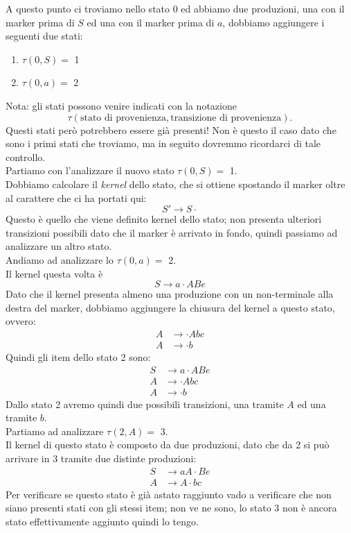 \documentclass[class=book, crop=false, oneside, 12pt]{standalone}
\begin{document}
A questo punto ci troviamo nello stato 0 ed abbiamo due produzioni, una con il marker prima di \(S\) ed una con il marker prima di \(a\), dobbiamo aggiungere i seguenti due stati:
\begin{enumerate}
    \item \(\tau (0, S) =\) 1
    \item \(\tau (0, a) =\) 2
\end{enumerate}
Nota: gli stati possono venire indicati con la notazione 
\begin{equation*}
    \tau( \textrm{stato di provenienza}, \textrm{transizione di provenienza}).
\end{equation*}
Questi stati però potrebbero essere già presenti! Non è questo il caso dato che sono i primi stati che troviamo, ma in seguito dovremmo ricordarci di tale controllo.
\\
Partiamo con l'analizzare il nuovo stato \(\tau (0, S) =\) 1. \\
Dobbiamo calcolare il \emph{kernel} dello stato, che si ottiene spostando il marker oltre al carattere che ci ha portati qui:
\begin{equation*}
    S' \to S \cdot
\end{equation*}
Questo è quello che viene definito kernel dello stato; non presenta ulteriori transizioni possibili dato che il marker è arrivato in fondo, quindi passiamo ad analizzare un altro stato.
\\
Andiamo ad analizzare lo \(\tau (0, a) =\) 2. \\
Il kernel questa volta è
\begin{equation*}
    S \to a \cdot ABe
\end{equation*}
Dato che il kernel presenta almeno una produzione con un non-terminale alla destra del marker, dobbiamo aggiungere la chiusura del kernel a questo stato, ovvero:
\begin{align*}
    A &\to \cdot Abc\\
	A &\to \cdot b
\end{align*}
Quindi gli item dello stato 2 sono:
\begin{align*}
    S &\to a \cdot ABe\\
    A &\to \cdot Abc\\
	A &\to \cdot b
\end{align*}
Dallo stato 2 avremo quindi due possibili transizioni, una tramite \(A\) ed una tramite \(b\).
\\
Partiamo ad analizzare \(\tau (2, A) =\) 3. \\
Il kernel di questo stato è composto da due produzioni, dato che da 2 si può arrivare in 3 tramite due distinte produzioni:
\begin{align*}
    S &\to aA \cdot Be \\
    A &\to A \cdot bc
\end{align*}
Per verificare se questo stato è già astato raggiunto vado a verificare che non siano presenti stati con gli stessi item; non ve ne sono, lo stato 3 non è ancora stato effettivamente aggiunto quindi lo tengo.
\end{document}
